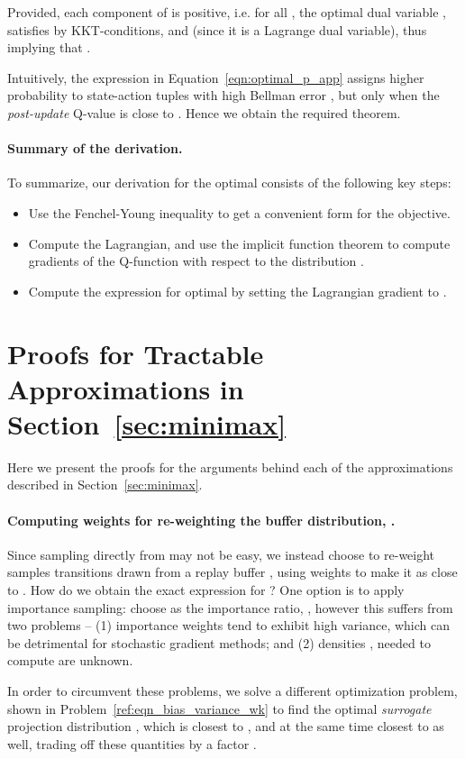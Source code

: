 \documentclass[jmlr]{article}
\begin{document}
Provided, each component of  is positive, i.e.  for all , the optimal dual variable , satisfies  by KKT-conditions, and  (since it is a Lagrange dual variable), thus implying that .

Intuitively, the expression in Equation~\ref{eqn:optimal_p_app} assigns higher probability to state-action tuples with high Bellman error , but only when the \textit{post-update} Q-value  is close to . Hence we obtain the required theorem. 
\paragraph{Summary of the derivation.} To summarize, our derivation for the optimal  consists of the following key steps:
\begin{itemize}
    \item Use the Fenchel-Young inequality to get a convenient form for the objective.
    \item Compute the Lagrangian, and use the implicit function theorem to compute gradients of the Q-function  with respect to the distribution .
    \item Compute the expression for optimal  by setting the Lagrangian gradient to . 
\end{itemize}

\section{Proofs for Tractable Approximations in Section~\ref{sec:minimax}}
\label{app:other_proofs}
Here we present the proofs for the arguments behind each of the approximations described in Section~\ref{sec:minimax}.
\paragraph{Computing weights  for re-weighting the buffer distribution, .} 
Since sampling directly from  may not be easy, we instead choose to re-weight samples transitions drawn from a replay buffer , using weights  to make it as close to . How do we obtain the exact expression for ? One option is to apply importance sampling: choose  as the importance ratio, , however this suffers from two problems -- (1) importance weights tend to exhibit high variance, which can be detrimental for stochastic gradient methods; and (2) densities , needed to compute  are unknown. 

In order to circumvent these problems, we solve a different optimization problem, shown in Problem~\ref{ref:eqn_bias_variance_wk} to find the optimal \textit{surrogate} projection distribution , which is closest to , and at the same time closest to  as well, trading off these quantities by a factor .
\end{document}
